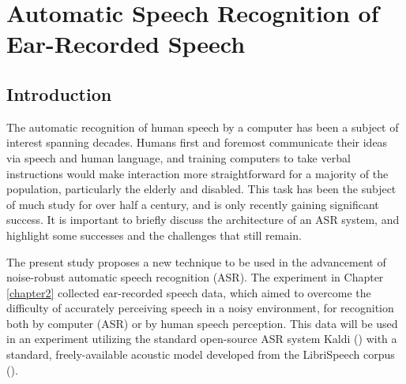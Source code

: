 % 
% 
% 

\chapter{Automatic Speech Recognition of Ear-Recorded Speech\label{chapter4}}


\section{Introduction}\label{chap4:introduction}

The automatic recognition of human speech by a computer has been a subject of interest spanning decades.  Humans first and foremost communicate their ideas via speech and human language, and training computers to take verbal instructions would make interaction more straightforward for a majority of the population, particularly the elderly and disabled. This task has been the subject of much study for over half a century, and is only recently gaining significant success.  It is important to briefly discuss the architecture of an ASR system, and highlight some successes and the challenges that still remain.

The present study proposes a new technique to be used in the advancement of noise-robust automatic speech recognition (ASR).
The experiment in Chapter \ref{chapter2} collected ear-recorded speech data, which aimed to overcome the difficulty of accurately perceiving speech in a noisy environment, for recognition both by computer (ASR) or by human speech perception.  This data will be used in an experiment utilizing the standard open-source ASR system Kaldi (\cite{povey:11}) with a standard, freely-available acoustic model developed from the LibriSpeech corpus (\cite{panayotov:15}).

